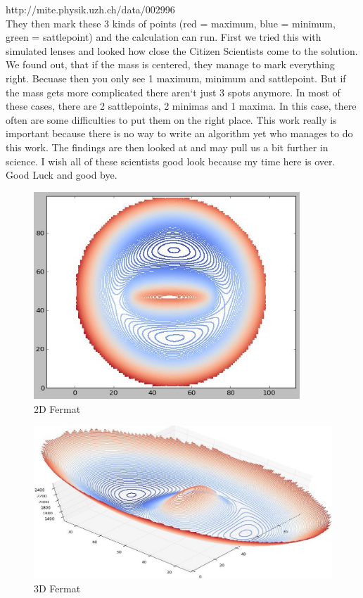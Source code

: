 \documentclass[pdftex,12pt,a4paper]{article}
\begin{document}
\clearfloat
http://mite.physik.uzh.ch/data/002996
\\[0mm]
They then mark these 3 kinds of points (red = maximum, blue = minimum, green = sattlepoint) and the calculation can run. First we tried this with simulated lenses and looked how close the Citizen Scientists come to the solution. We found out, that if the mass is centered, they manage to mark everything right. Becuase then you only see 1 maximum, minimum and sattlepoint. But if the mass gets more complicated there aren`t just 3 spots anymore. In most of these cases, there are 2 sattlepoints, 2 minimas and 1 maxima. In this case, there often are some difficulties to put them on the right place. This work really is important because there is no way to write an algorithm yet who manages to do this work. The findings are then looked at and may pull us a bit further in science. I wish all of these scientists good look because my time here is over. Good Luck and good bye.

\begin{figure}[position=h]
\centering
 \caption{2D Fermat}
 \includegraphics[width=10cm]{Bilder/Fermat2}%
\end{figure}

\begin{figure}[position=h]
\centering
 \caption{3D Fermat}
 \includegraphics[width=15cm]{Bilder/Fermat}%
\end{figure}
\end{document}
